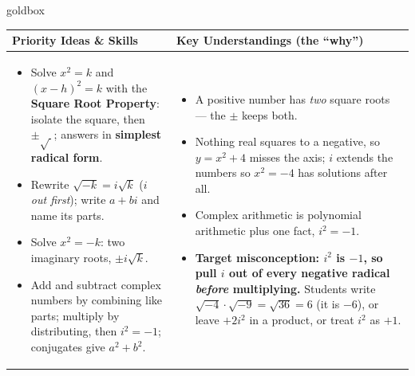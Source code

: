 \documentclass[10pt]{article}
\begin{document}
\renewcommand{\arraystretch}{1.4}
\begin{skillbox}{goldbox}
\begin{tabularx}{\linewidth}{@{}X|X@{}}
\textbf{Priority Ideas \& Skills} & \textbf{Key Understandings (the ``why'')} \\[2pt]
\hline
\vspace{-6pt}
\begin{itemize}[leftmargin=1.1em, nosep, after=\vspace{2pt}]
  \item Solve $x^2=k$ and $(x-h)^2=k$ with the \textbf{Square Root Property}: isolate the square,
        then $\pm\sqrt{\ }$; answers in \textbf{simplest radical form}.
  \item Rewrite $\sqrt{-k}=i\sqrt k$ (\emph{$i$ out first}); write $a+bi$ and name its parts.
  \item Solve $x^2=-k$: two imaginary roots, $\pm i\sqrt k$.
  \item Add and subtract complex numbers by combining like parts; multiply by distributing, then
        $i^2=-1$; conjugates give $a^2+b^2$.
\end{itemize}
&
\vspace{-6pt}
\begin{itemize}[leftmargin=1.1em, nosep, after=\vspace{2pt}]
  \item A positive number has \emph{two} square roots --- the $\pm$ keeps both.
  \item Nothing real squares to a negative, so $y=x^2+4$ misses the axis; $i$ extends the
        numbers so $x^2=-4$ has solutions after all.
  \item Complex arithmetic is polynomial arithmetic plus one fact, $i^2=-1$.
  \item \textbf{Target misconception: $i^2$ is $-1$, so pull $i$ out of every negative radical
        \emph{before} multiplying.} Students write $\sqrt{-4}\cdot\sqrt{-9}=\sqrt{36}=6$
        (it is $-6$), or leave $+2i^2$ in a product, or treat $i^2$ as $+1$.
\end{itemize}
\end{tabularx}
\end{skillbox}
\end{document}
